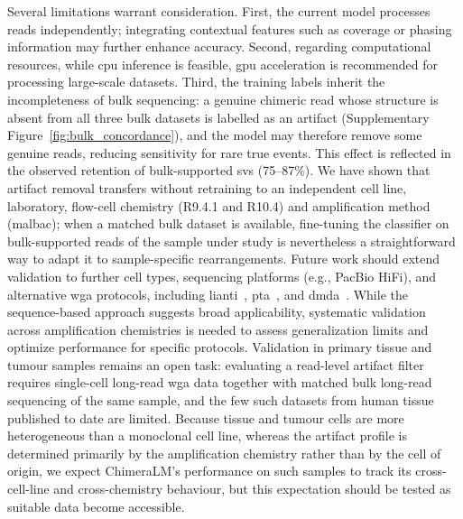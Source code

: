 \documentclass[pdflatex,lineno]{sn-jnl}%
\newif\ifrevisedtext
\newcommand{\chg}[1]{\ifrevisedtext\textcolor{revcolor}{#1}\else#1\fi}
\begin{document}
Several limitations warrant consideration.
First, the current model processes reads independently; integrating contextual features such as coverage or phasing information may further enhance accuracy.
Second, regarding computational resources, while \gls{cpu} inference is feasible, \gls{gpu} acceleration is recommended for processing large-scale datasets.
\chg{Third, the training labels inherit the incompleteness of bulk sequencing: a genuine chimeric read whose structure is absent from all three bulk datasets is labelled as an artifact (Supplementary Figure~\ref{fig:bulk_concordance}), and the model may therefore remove some genuine reads, reducing sensitivity for rare true events. This effect is reflected in the observed retention of bulk-supported \glspl{sv} (75--87\%).}
\chg{We have shown that artifact removal transfers without retraining to an independent cell line, laboratory, flow-cell chemistry (R9.4.1 and R10.4) and amplification method (\gls{malbac}); when a matched bulk dataset is available, fine-tuning the classifier on bulk-supported reads of the sample under study is nevertheless a straightforward way to adapt it to sample-specific rearrangements.}
Future work should extend validation to further cell types, sequencing platforms (e.g., PacBio HiFi), and alternative \gls{wga} protocols, including \gls{lianti}~\cite{chen2017singlecell}, \gls{pta}~\cite{gonzalez-pena2021accurate}, and \gls{dmda}~\cite{dippenaar2024droplet}.
While the sequence-based approach suggests broad applicability, systematic validation across amplification chemistries is needed to assess generalization limits and optimize performance for specific protocols.
\chg{Validation in primary tissue and tumour samples remains an open task: evaluating a read-level artifact filter requires single-cell long-read \gls{wga} data together with matched bulk long-read sequencing of the same sample, and the few such datasets from human tissue published to date are limited.
	Because tissue and tumour cells are more heterogeneous than a monoclonal cell line, whereas the artifact profile is determined primarily by the amplification chemistry rather than by the cell of origin, we expect ChimeraLM's performance on such samples to track its cross-cell-line and cross-chemistry behaviour, but this expectation should be tested as suitable data become accessible.}
\end{document}
